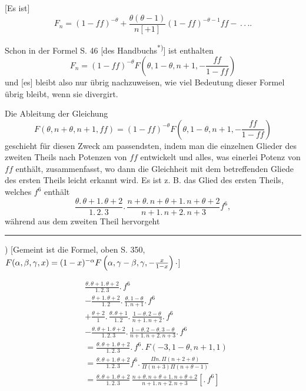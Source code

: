 \noindent\hspace*{\parindent}[Es ist]
\[
F_n=(1-ff)^{-\theta}+\frac{\theta(\theta-1)}{n[+1]}(1-ff)^{-\theta-1}ff-\,{.}\,{.}\,{.}.
\]

\indent Schon in der Formel S. 46 [des Handbuchs\textsuperscript{*)}] ist enthalten
\[
F_n=(1-ff)^{-\theta}F\left(\theta,1-\theta,n+1,-\frac{ff}{1-ff}\right)
\]
\noindent und [es] bleibt also nur übrig nachzuweisen, wie viel Bedeutung dieser Formel übrig bleibt, wenn sie divergirt.
\par\smallskip\noindent{\small[S. 290]}\par
\noindent\hspace*{\parindent}Die Ableitung der Gleichung
\[
F(\theta,n+\theta,n+1,ff)=(1-ff)^{-\theta}F\left(\theta,1-\theta,n+1,-\frac{ff}{1-ff}\right)
\]
\noindent geschieht für diesen Zweck am passendsten, indem man die einzelnen Glieder des zweiten Theils nach Potenzen von $ff$ entwickelt und alles, was einerlei Potenz von $ff$ enthält, zusammenfasst, wo dann die Gleichheit mit dem betreffenden Gliede des ersten Theils leicht erkannt wird. Es ist z. B. das Glied des ersten Theils, welches $f^6$ enthält
\[
\frac{\theta{.}\,\theta+1{.}\,\theta+2}{1{.}\,2{.}\,3}{.}\,
\frac{n+\theta{.}\,n+\theta+1{.}\,n+\theta+2}{n+1{.}\,n+2{.}\,n+3}f^6,
\]
\noindent während aus dem zweiten Theil hervorgeht
\par\medskip\noindent\rule{.25\linewidth}{.4pt}\par\smallskip
{\small\noindent *) [Gemeint ist die Formel, oben S. 350, $F(\alpha,\beta,\gamma,x)=(1-x)^{-\alpha}F\left(\alpha,\gamma-\beta,\gamma,-\frac{x}{1-x}\right)\mathpunct{\raisebox{.35ex}{.}}$]\par}
\clearpage{}
\[
\begin{aligned}
&\frac{\theta{.}\,\theta+1{.}\,\theta+2}{1{.}\,2{.}\,3}{.}\,f^6\\[.8em]
&-\frac{\theta+1{.}\,\theta+2}{1{.}\,2}{.}\,\frac{\theta{.}\,1-\theta}{1{.}\,n+1}{.}\,f^6\\[.8em]
&+\frac{\theta+2}{1}{.}\,\frac{\theta{.}\,\theta+1}{1{.}\,2}{.}\,\frac{1-\theta{.}\,2-\theta}{n+1{.}\,n+2}{.}\,f^6\\[.8em]
&-\frac{\theta{.}\,\theta+1{.}\,\theta+2}{1{.}\,2{.}\,3}{.}\,\frac{1-\theta{.}\,2-\theta{.}\,3-\theta}{n+1{.}\,n+2{.}\,n+3}{.}\,f^6\\[.8em]
&=\frac{\theta{.}\,\theta+1{.}\,\theta+2}{1{.}\,2{.}\,3}{.}\,f^6{.}\,F(-3,1-\theta,n+1,1)\\[.8em]
&=\frac{\theta{.}\,\theta+1{.}\,\theta+2}{1{.}\,2{.}\,3}f^6{.}\,\frac{\Pi n{.}\,\Pi(n+2+\theta)}{\Pi(n+3)\Pi(n+\theta-1)}\\[.8em]
&=\frac{\theta{.}\,\theta+1{.}\,\theta+2}{1{.}\,2{.}\,3}\,
\frac{n+\theta{.}\,n+\theta+1{.}\,n+\theta+2}{n+1{.}\,n+2{.}\,n+3}[{.}\,f^6]
\end{aligned}
\]
\clearpage
